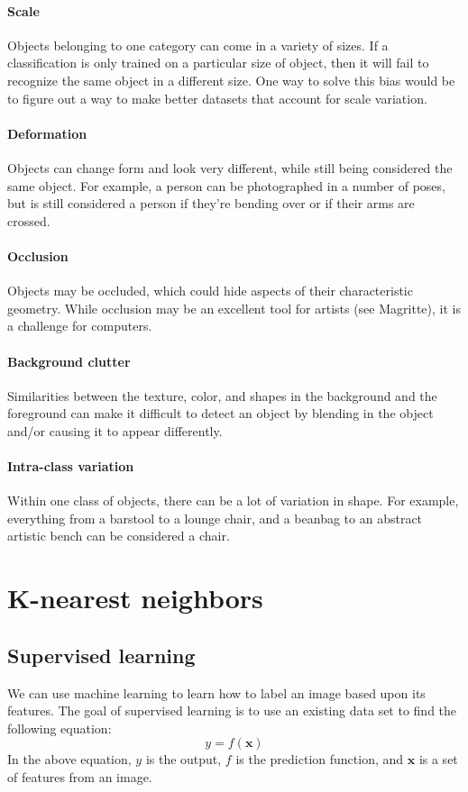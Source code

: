 \documentclass{article}
\begin{document}
\paragraph{Scale} Objects belonging to one category can come in a variety of sizes. If a classification is only trained on a particular size of object, then it will fail to recognize the same object in a different size. One way to solve this bias would be to figure out a way to make better datasets that account for scale variation.

\paragraph{Deformation} Objects can change form and look very different, while still being considered the same object. For example, a person can be photographed in a number of poses, but is still considered a person if they're bending over or if their arms are crossed.

\paragraph{Occlusion} Objects may be occluded, which could hide aspects of their characteristic geometry. While occlusion may be an excellent tool for artists (see Magritte), it is a challenge for computers.

\paragraph{Background clutter} Similarities between the texture, color, and shapes in the background and the foreground can make it difficult to detect an object by blending in the object and/or causing it to appear differently.

\paragraph{Intra-class variation} Within one class of objects, there can be a lot of variation in shape. For example, everything from a barstool to a lounge chair, and a beanbag to an abstract artistic bench can be considered a chair. 

\section{K-nearest neighbors}

\subsection{Supervised learning}
We can use machine learning to learn how to label an image based upon its features. The goal of supervised learning is to use an existing data set to find the following equation:
\begin{equation}
y=f(\mathbf{x})
\end{equation}
In the above equation, $y$ is the output, $f$ is the prediction function, and $\mathbf{x}$ is a set of features from an image.\\
\end{document}
